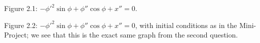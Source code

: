 \documentclass[hidelinks, 11pt]{article}
\begin{document}
\begin{center}
\begin{changemargin}{4.5cm}{4.5cm}  
  Figure 2.1: $-\phi'^2\sin{\phi} + \phi''\cos{\phi} + x'' = 0$.
\end{changemargin}

\begin{changemargin}{0.5cm}{0.5cm}  
  Figure 2.2: $-\phi'^2\sin{\phi} + \phi''\cos{\phi} + x'' = 0$, with initial conditions as in the Mini-Project; we see that this is the exact same graph from the second question.
\end{changemargin}
\end{center}
\end{document}
